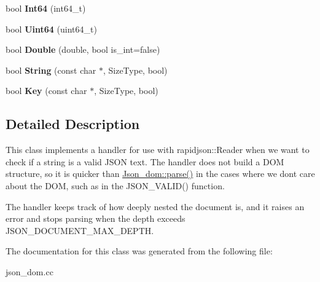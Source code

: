\begin{DoxyCompactItemize}
bool {\bfseries Int64} (int64\+\_\+t)
\item 
\mbox{\label{classSyntax__check__handler_abbdfec1ecd6756e0b36b73acd38b856d}} 
bool {\bfseries Uint64} (uint64\+\_\+t)
\item 
\mbox{\label{classSyntax__check__handler_a17dd421e275eb4329bc74908ae3e7c1a}} 
bool {\bfseries Double} (double, bool is\+\_\+int=false)
\item 
\mbox{\label{classSyntax__check__handler_a564b2e23da6cc2dd5a2059e9469dca84}} 
bool {\bfseries String} (const char $\ast$, Size\+Type, bool)
\item 
\mbox{\label{classSyntax__check__handler_acbd811d5713fcf967f9d1592df36ea1c}} 
bool {\bfseries Key} (const char $\ast$, Size\+Type, bool)
\end{DoxyCompactItemize}


\subsection{Detailed Description}
This class implements a handler for use with rapidjson\+::\+Reader when we want to check if a string is a valid J\+S\+ON text. The handler does not build a D\+OM structure, so it is quicker than \mbox{\hyperlink{classJson__dom_a9615aa0ae1427d5f5986a2d85d506716}{Json\+\_\+dom\+::parse()}} in the cases where we don\textquotesingle{}t care about the D\+OM, such as in the J\+S\+O\+N\+\_\+\+V\+A\+L\+I\+D() function.

The handler keeps track of how deeply nested the document is, and it raises an error and stops parsing when the depth exceeds J\+S\+O\+N\+\_\+\+D\+O\+C\+U\+M\+E\+N\+T\+\_\+\+M\+A\+X\+\_\+\+D\+E\+P\+TH. 

The documentation for this class was generated from the following file\+:\begin{DoxyCompactItemize}
\item 
json\+\_\+dom.\+cc\end{DoxyCompactItemize}
